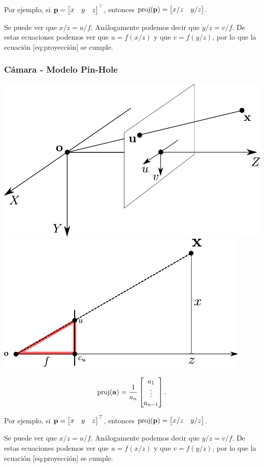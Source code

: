 \begin{frame}
    Por ejemplo, si $\boldsymbol{\mathbf{p}}=\begin{bmatrix}x & y & z\end{bmatrix}^{\top}$, entonces $\operatorname{proj}(\boldsymbol{\mathbf{p}})=\begin{bmatrix}x/z & y/z\end{bmatrix}$.
    
    Se puede ver que $x/z=u/f$. Análogamente podemos decir que $y/z=v/f$. De estas ecuaciones podemos ver que $u=f(x/z)$ y que $v=f(y/z)$, por lo que la ecuación [eq:proyección] se cumple.
    
\end{frame}

\begin{frame}
    \frametitle{Cámara - Modelo Pin-Hole}
    
    \includegraphics[width=0.4\columnwidth]{images/camera/pinhole_camera_model.pdf}
    \includegraphics[width=0.4\columnwidth]{images/camera/pinhole_camera_model2.pdf}
    \footnotesize
    
    \begin{equation*}
        \operatorname{proj}(\boldsymbol{\mathbf{a}})=
        \frac{1}{a_{n}}\begin{bmatrix}a_{1}\\
            \vdots\\
            a_{n-1}
        \end{bmatrix}.
    \end{equation*}
    
    Por ejemplo, si $\boldsymbol{\mathbf{p}}=\begin{bmatrix}x & y & z\end{bmatrix}^{\top}$, entonces $\operatorname{proj}(\boldsymbol{\mathbf{p}})=\begin{bmatrix}x/z & y/z\end{bmatrix}$.
    
    Se puede ver que $x/z=u/f$. Análogamente podemos decir que $y/z=v/f$. De estas ecuaciones podemos ver que $u=f(x/z)$ y que $v=f(y/z)$, por lo que la ecuación [eq:proyección] se cumple.
    
\end{frame}


